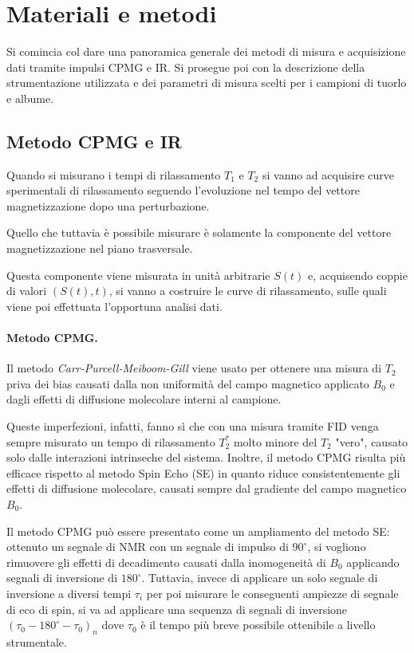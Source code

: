 \section*{Materiali e metodi}

Si comincia col dare una panoramica generale dei metodi di misura e acquisizione dati tramite impulsi CPMG e IR. Si prosegue poi con la descrizione della strumentazione utilizzata e dei parametri di misura scelti per i campioni di tuorlo e albume.

\subsection*{Metodo CPMG e IR}

Quando si misurano i tempi di rilassamento $T_1$ e $T_2$ si vanno ad acquisire curve sperimentali di rilassamento seguendo l'evoluzione nel tempo del vettore magnetizzazione dopo una perturbazione.

Quello che tuttavia è possibile misurare è solamente la componente del vettore magnetizzazione nel piano trasversale.

Questa componente viene misurata in unità arbitrarie $S(t)$ e, acquisendo coppie di valori $(S(t), t)$, si vanno a costruire le curve di rilassamento, sulle quali viene poi effettuata l'opportuna analisi dati.

\paragraph{Metodo CPMG.}

Il metodo \textit{Carr-Purcell-Meiboom-Gill} viene usato per ottenere una misura di $T_2$ priva dei bias causati dalla non uniformità del campo magnetico applicato $B_0$ e dagli effetti di diffusione molecolare interni al campione.

Queste imperfezioni, infatti, fanno sì che con una misura tramite FID venga sempre misurato un tempo di rilassamento $T_2^*$ molto minore del $T_2$ "vero", causato solo dalle interazioni intrinseche del sistema. Inoltre, il metodo CPMG risulta più efficace rispetto al metodo Spin Echo (SE) in quanto riduce consistentemente gli effetti di diffusione molecolare, causati sempre dal gradiente del campo magnetico $B_0$.

Il metodo CPMG può essere presentato come un ampliamento del metodo SE: ottenuto un segnale di NMR con un segnale di impulso di $90^\circ$, si vogliono rimuovere gli effetti di decadimento causati dalla inomogeneità di $B_0$ applicando segnali di inversione di $180^\circ$. Tuttavia, invece di applicare un solo segnale di inversione a diversi tempi $\tau_i$ per poi misurare le conseguenti ampiezze di segnale di eco di spin, si va ad applicare una sequenza di segnali di inversione $(\tau_0 - 180^\circ - \tau_0)_n$ dove $\tau_0$ è il tempo più breve possibile ottenibile a livello strumentale.\\

